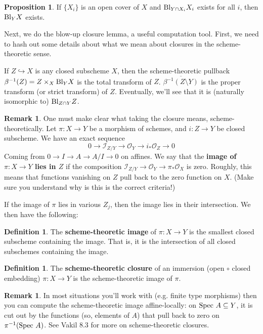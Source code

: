 \documentclass[10pt,reqno]{amsart}
\theoremstyle{definition}
\newtheorem{definition}[theorem]{Definition}
\newtheorem{proposition}[theorem]{Proposition}
\newtheorem{remark}[theorem]{Remark}
\theoremstyle{remark}
\numberwithin{equation}{section}
\numberwithin{theorem}{section}
\newcommand{\OO}{{\mathcal O}}
\newcommand{\spec}{\textup{Spec }}
\newcommand{\II}{{\mathscr I}}
\newcommand{\Bl}{\textup{Bl}}
\begin{document}
\begin{proposition} If $\{X_i\}$ is an open cover of $X$ and $\Bl_{Y \cap X_i}X_i$ exists for all $i$, then $\Bl_Y X$ exists.
\end{proposition}

Next, we do the blow-up closure lemma, a useful computation tool. First, we need to hash out some details about what we mean about closures in the scheme-theoretic sense.

 If $Z \hookrightarrow X$ is any closed subscheme $X$, then the scheme-theoretic pullback $\beta^{-1}(Z) = Z \times_X \Bl_Y X$ is the total transform of $Z$. $\overline{\beta^{-1}(Z \setminus Y)}$ is the proper transform (or strict transform) of $Z$. Eventually, we'll see that it is (naturally isomorphic to) $\Bl_{Z \cap Y} Z$.

\begin{remark} One must make clear what taking the closure means, scheme-theoretically. Let $\pi: X \to Y$ be a morphism of schemes, and $i: Z \to Y$ be closed subscheme. We have an exact sequence
\[0 \to \II_{Z/Y} \to \OO_Y \to i_*\OO_Z \to 0\]
Coming from $0 \to I \to A \to A/I \to 0$ on affines. We say that the \textbf{image of $\pi: X \to Y$ lies in $Z$} if the composition $\II_{Z/Y} \to \OO_Y \to \pi_* \OO_X$ is zero. Roughly, this means that functions vanishing on $Z$ pull back to the zero function on $X$. (Make sure you understand why is this is the correct criteria!)

If the image of $\pi$ lies in various $Z_j$, then the image lies in their intersection. We then have the following:
\end{remark}

\begin{definition} The \textbf{scheme-theoretic image} of $\pi: X \to Y$ is the smallest closed subscheme containing the image. That is, it is the intersection of all closed subschemes containing the image.
\end{definition}

\begin{definition} The \textbf{scheme-theoretic closure} of an immersion (open $\circ$ closed embedding) $\pi: X \to Y$ is the scheme-theoretic image of $\pi$.
\end{definition}

\begin{remark} In most situations you'll work with (e.g. finite type morphisms) then you can compute the scheme-theoretic image affine-locally: on $\spec A \subseteq Y$, it is cut out by the functions (so, elements of $A$) that pull back to zero on $\pi^{-1}(\spec A)$. See Vakil 8.3 for more on scheme-theoretic closures.
\end{remark}
\end{document}
